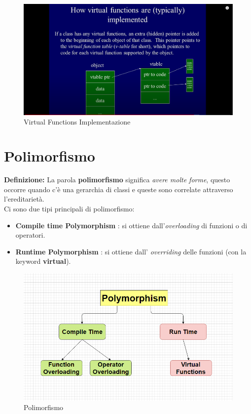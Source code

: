 \begin{figure}[H]
	\centering
	\includegraphics[width=1\textwidth, height=1\textheight, keepaspectratio]{./imgs/virtual_functions_implementation.png}
	\caption{Virtual Functions Implementazione}
	\label{fig:virtual_functions_implementation}
\end{figure}


\section{Polimorfismo}

\textsf{\small \textbf{Definizione:} La parola \textbf{polimorfismo} significa \emph{avere molte forme}, questo occorre quando c'è una gerarchia di classi e queste sono correlate attraverso l'ereditarietà.} \\

\textsf{\small Ci sono due tipi principali di polimorfismo: }

\begin{itemize}
	\item \textsf{\small \textbf{Compile time Polymorphism} : si ottiene dall'\emph{overloading} di funzioni o di operatori.}
	\item \textsf{\small \textbf{Runtime Polymorphism} : si ottiene dall' \emph{overriding} delle funzioni (con la keyword \textbf{virtual}).}
\end{itemize}

\begin{figure}[H]
	\centering
	\includegraphics[width=1\textwidth, height=1\textheight, keepaspectratio]{./imgs/polymorphism.png}
	\caption{Polimorfismo}
	\label{fig:polymorphism}
\end{figure}

